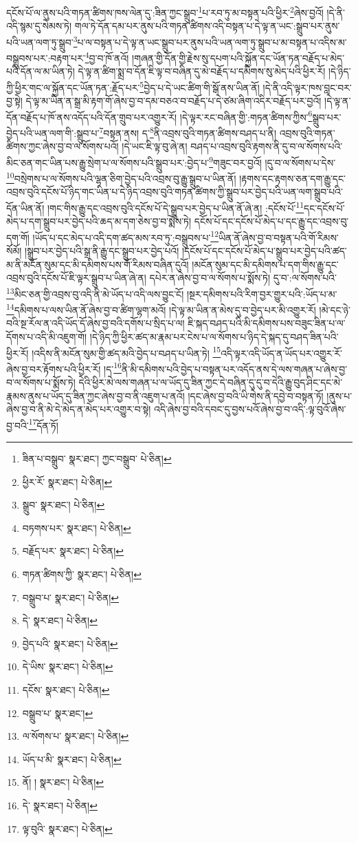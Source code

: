 དངོས་པོ་ལ་ནུས་པའི་གཏན་ཚིགས་ཁས་ལེན་དུ་:ཟིན་ཀྱང་སྒྲུབ་\footnote{ཟིན་པ་བསྒྲུབ་  སྣར་ཐང་། ཀྱང་བསྒྲུབ་  པེ་ཅིན། }པ་རབ་ཏུ་མ་བསྟན་པའི་ཕྱིར་\footnote{ཕྱིར་རོ་  སྣར་ཐང་།  པེ་ཅིན། }ཞེས་བྱའོ། །དེ་ནི་འདི་སྙམ་དུ་སེམས་ཏེ། གལ་ཏེ་དོན་དམ་པར་ནུས་པའི་གཏན་ཚིགས་འདི་བསྟན་པ་དེ་ལྟ་ན་ཡང་:སྒྲུབ་པར་ནུས་པའི་ཡན་ལག་ཏུ་སྒྲུབ་\footnote{སྒྲུབ་  སྣར་ཐང་།  པེ་ཅིན། }པ་ལ་བསྟན་པ་དེ་ལྟ་ན་ཡང་སྒྲུབ་པར་ནུས་པའི་ཡན་ལག་ཏུ་སྒྲུབ་པ་མ་བསྟན་པ་འདིས་མ་བསྒྲུབས་པར་:བརྟག་པར་\footnote{བཏགས་པར་  སྣར་ཐང་།  པེ་ཅིན། }བྱ་བ་ཁོ་ནའོ། །གཞན་གྱི་དོན་གྱི་རྗེས་སུ་དཔག་པའི་སྐྱོན་དང་ཡོན་ཏན་བརྗོད་པ་མེད་པའི་དོན་ལ་མ་ཡིན་ཏེ། དེ་ལྟ་ན་ཚིག་སྨྲ་བ་དོན་ཇི་ལྟ་བ་བཞིན་དུ་མེ་བརྗོད་པ་དམིགས་སུ་མེད་པའི་ཕྱིར་རོ། །དེ་ཉིད་ཀྱི་ཕྱིར་གང་ལ་སྐྱོན་དང་ཡོན་ཏན་:རྗོད་པར་\footnote{བརྗོད་པར་  སྣར་ཐང་།  པེ་ཅིན། }བྱེད་པ་དེ་ཡང་ཚིག་གི་སྒོ་ནས་ཡིན་ནོ། །དེ་ནི་འདི་ལྟར་ཁས་བླང་བར་བྱ་སྟེ། དེ་ལྟ་མ་ཡིན་ན་སྒྲ་མི་རྟག་གོ་ཞེས་བྱ་བ་དམ་བཅའ་བ་བརྗོད་པ་དེ་ཙམ་ཞིག་འདིར་བརྗོད་པར་བྱའོ། །དེ་ལྟ་ན་དོན་བརྗོད་པ་ཁོ་ནས་འདོད་པའི་དོན་གྲུབ་པར་འགྱུར་རོ། །དེ་ལྟར་རང་བཞིན་གྱི་:གཏན་ཚིགས་ཀྱིས་\footnote{གཏན་ཚིགས་ཀྱི་  སྣར་ཐང་།  པེ་ཅིན། }སྒྲུབ་པར་བྱེད་པའི་ཡན་ལག་གི་:སྒྲུབ་པ་\footnote{བསྒྲུབ་པ་  སྣར་ཐང་།  པེ་ཅིན། }བསྟན་ནས། ད་\footnote{དེ་  སྣར་ཐང་།  པེ་ཅིན། }ནི་འབྲས་བུའི་གཏན་ཚིགས་བཤད་པ་ནི། འབྲས་བུའི་གཏན་ཚིགས་ཀྱང་ཞེས་བྱ་བ་ལ་སོགས་པའོ། །དེ་ཡང་ཇི་ལྟ་བུ་ཞེ་ན། བཤད་པ་འབྲས་བུའི་རྟགས་ནི་དུ་བ་ལ་སོགས་པའི་མིང་ཅན་གང་ཡིན་པས་རྒྱུ་སྲེག་པ་ལ་སོགས་པའི་སྒྲུབ་པར་:བྱེད་པ་\footnote{བྱེད་པའི་  སྣར་ཐང་།  པེ་ཅིན། }གཟུང་བར་བྱའོ། །དུ་བ་ལ་སོགས་པ་དེས་\footnote{དེ་ཡིས་  སྣར་ཐང་།  པེ་ཅིན། }བསྲེགས་པ་ལ་སོགས་པའི་ལྷན་ཅིག་བྱེད་པའི་འབྲས་བུ་རྒྱུ་སྒྲུབ་པ་ཡིན་ནོ། །རྟགས་དང་རྟགས་ཅན་དག་རྒྱུ་དང་འབྲས་བུའི་དངོས་པོ་ཉིད་གང་ཡིན་པ་དེ་ཉིད་འབྲས་བུའི་གཏན་ཚིགས་ཀྱི་སྒྲུབ་པར་བྱེད་པའི་ཡན་ལག་སྒྲུབ་པའི་དོན་ཡིན་ནོ། །གང་གིས་རྒྱུ་དང་འབྲས་བུའི་དངོས་པོ་དེ་སྒྲུབ་པར་བྱེད་པ་ཡིན་ནོ་ཞེ་ན། :དངོས་པོ་\footnote{དངོས་  སྣར་ཐང་།  པེ་ཅིན། }དང་དངོས་པོ་མེད་པ་དག་སྒྲུབ་པར་བྱེད་པའི་ཆད་མ་དག་ཅེས་བྱ་བ་སྨོས་ཏེ། དངོས་པོ་དང་དངོས་པོ་མེད་པ་དང་རྒྱུ་དང་འབྲས་བུ་དག་གོ། །ཡོད་པ་དང་མེད་པ་འདི་དག་ཚད་མས་རབ་ཏུ་:བསྒྲུབས་པ་\footnote{བསྒྲུབ་པ་  སྣར་ཐང་། }ཡིན་ནོ་ཞེས་བྱ་བ་བསྟན་པའི་གོ་རིམས་སོམོ། །སྒྲུབ་པར་བྱེད་པའི་སྒྲ་ནི་རྒྱུ་དང་སྒྲུབ་པར་བྱེད་པའོ། །དངོས་པོ་དང་དངོས་པོ་མེད་པ་སྒྲུབ་པར་བྱེད་པའི་ཚད་མ་ནི་མངོན་སུམ་དང་མི་དམིགས་པས་གོ་རིམས་བཞིན་དུའོ། །མངོན་སུམ་དང་མི་དམིགས་པ་དག་གིས་རྒྱུ་དང་འབྲས་བུའི་དངོས་པོ་ཇི་ལྟར་སྒྲུབ་པ་ཡིན་ཞེ་ན། དཔེར་ན་ཞེས་བྱ་བ་ལ་སོགས་པ་སྨོས་ཏེ། དུ་བ་:ལ་སོགས་པའི་\footnote{ལ་སོགས་པ་  སྣར་ཐང་།  པེ་ཅིན། }མིང་ཅན་གྱི་འབྲས་བུ་འདི་ནི་མེ་ཡོད་པ་འདི་ལས་བྱུང་ངོ། །སྔར་དམིགས་པའི་རིག་བྱར་གྱུར་པའི་:ཡོད་པ་མ་\footnote{ཡོད་པ་མི་  སྣར་ཐང་།  པེ་ཅིན། }དམིགས་པ་ལས་ཡིན་ནོ་ཞེས་བྱ་བ་ཚིག་ལྷག་མའོ། །དེ་ལྟ་མ་ཡིན་ན་མེས་དུ་བ་བྱེད་པར་མི་འགྱུར་རོ། །མེ་དང་ཉེ་བའི་སྔ་རོལ་ན་འདི་ཡོད་དོ་ཞེས་བྱ་བའི་དགོས་པ་སྲིད་པ་ལ། ཇི་སྐད་བཤད་པའི་མི་དམིགས་པས་བཟུང་ཟིན་པ་ལ་དོགས་པ་འདི་མི་འཇུག་གོ། །དེ་ཉིད་ཀྱི་ཕྱིར་ཚད་མ་རྣམ་པར་ངེས་པ་ལ་སོགས་པ་ཉིད་དེ་སྐད་དུ་བཤད་ཟིན་པའི་ཕྱིར་རོ། །འདིས་ནི་མངོན་སུམ་གྱི་ཚད་མའི་བྱེད་པ་བཤད་པ་ཡིན་ཏེ། \footnote{ནོ། །   སྣར་ཐང་།  པེ་ཅིན། }འདི་ལྟར་འདི་ཡོད་ན་ཡོད་པར་འགྱུར་རོ་ཞེས་བྱ་བར་རྟོགས་པའི་ཕྱིར་རོ། །ད་\footnote{དེ་  སྣར་ཐང་།  པེ་ཅིན། }ནི་མི་དམིགས་པའི་བྱེད་པ་བསྟན་པར་འདོད་ནས་དེ་ལས་གཞན་པ་ཞེས་བྱ་བ་ལ་སོགས་པ་སྨོས་ཏེ། དེའི་ཕྱིར་མེ་ལས་གཞན་པ་ལ་ཡོད་དུ་ཟིན་ཀྱང་དེ་བཞིན་དུ་དུ་བ་དེའི་རྒྱུ་བུད་ཤིང་དང་མེ་རྣམས་ནུས་པ་ཡོད་དུ་ཟིན་ཀྱང་ཞེས་བྱ་བ་ནི་འཇུག་པ་ནའོ། །དང་ཞེས་བྱ་བའི་ཡི་གེས་ནི་དབྱེ་བ་བསྟན་ཏོ། །ནུས་པ་ཞེས་བྱ་བ་ནི་མེ་དེ་མེད་ན་མེད་པར་འགྱུར་བ་སྟེ། འདི་ཞེས་བྱ་བའི་དབང་དུ་བྱས་པའོ་ཞེས་བྱ་བ་འདི་:ལྟ་བུའོ་ཞེས་བྱ་བའི་\footnote{ལྟ་བུའི་  སྣར་ཐང་།  པེ་ཅིན། }དོན་ཏོ། 